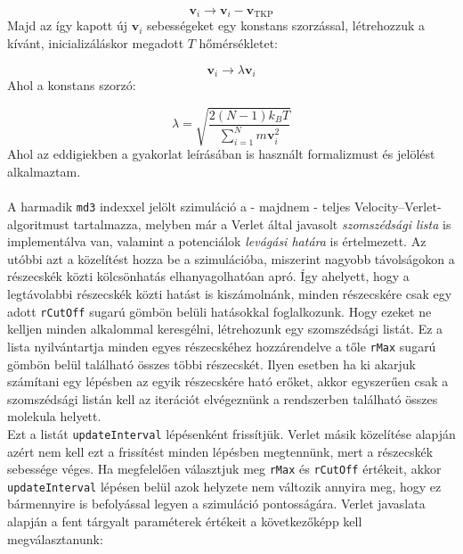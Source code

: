 \begin{multicols}{2}
\begin{equation}
    \boldsymbol{v}_{i}
    \to
    \boldsymbol{v}_{i} - \boldsymbol{v}_{\text{TKP}}
\end{equation}
Majd az így kapott új $\boldsymbol{v}_{i}$ sebességeket egy konstans szorzással, létrehozzuk a kívánt, inicializáláskor megadott $T$ hőmérsékletet:

\begin{equation}
    \boldsymbol{v}_{i}
    \to
    \lambda \boldsymbol{v}_{i}
\end{equation}
Ahol a konstans szorzó:

\begin{equation}
    \lambda
    =
    \sqrt{\frac{2 \left( N - 1 \right) k_{B} T}{\sum_{i = 1}^{N} m \boldsymbol{v}_{i}^{2}}}
\end{equation}
Ahol az eddigiekben a gyakorlat leírásában is használt formalizmust és jelölést alkalmaztam\cite{szamszim}.
\\ \\
A harmadik \texttt{md3} indexxel jelölt szimuláció a - majdnem - teljes Velocity--Verlet-algoritmust tartalmazza, melyben már a Verlet által javasolt \textit{szomszédsági lista} is implementálva van, valamint a potenciálok \textit{levágási határa} is értelmezett. Az utóbbi azt a közelítést hozza be a szimulációba, miszerint nagyobb távolságokon a részecskék közti kölcsönhatás elhanyagolhatóan apró. Így ahelyett, hogy a legtávolabbi részecskék közti hatást is kiszámolnánk, minden részecskére csak egy adott \texttt{rCutOff} sugarú gömbön belüli hatásokkal foglalkozunk. Hogy ezeket ne kelljen minden alkalommal keresgélni, létrehozunk egy szomszédsági listát. Ez a lista nyilvántartja minden egyes részecskéhez hozzárendelve a tőle \texttt{rMax} sugarú gömbön belül található összes többi részecskét. Ilyen esetben ha ki akarjuk számítani egy lépésben az egyik részecskére ható erőket, akkor egyszerűen csak a szomszédsági listán kell az iterációt elvégeznünk a rendszerben található összes molekula helyett. \\
Ezt a listát \texttt{updateInterval} lépésenként frissítjük. Verlet másik közelítése alapján azért nem kell ezt a frissítést minden lépésben megtennünk, mert a részecskék sebessége véges. Ha megfelelően választjuk meg \texttt{rMax} és \texttt{rCutOff} értékeit, akkor \texttt{updateInterval} lépésen belül azok helyzete nem változik annyira meg, hogy ez bármennyire is befolyással legyen a szimuláció pontosságára. Verlet javaslata alapján a fent tárgyalt paraméterek értékeit a következőképp kell megválasztanunk:


\end{multicols}
